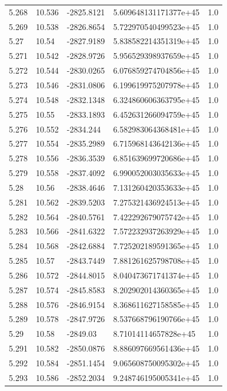 \begin{tabular}{lllll}
5.268 & 10.536 & -2825.8121 & 5.609648131171377e+45 & 1.0 \\
5.269 & 10.538 & -2826.8654 & 5.722970540499523e+45 & 1.0 \\
5.27 & 10.54 & -2827.9189 & 5.838582214351319e+45 & 1.0 \\
5.271 & 10.542 & -2828.9726 & 5.956529398937659e+45 & 1.0 \\
5.272 & 10.544 & -2830.0265 & 6.076859274704856e+45 & 1.0 \\
5.273 & 10.546 & -2831.0806 & 6.199619975207978e+45 & 1.0 \\
5.274 & 10.548 & -2832.1348 & 6.324860606363795e+45 & 1.0 \\
5.275 & 10.55 & -2833.1893 & 6.452631266094759e+45 & 1.0 \\
5.276 & 10.552 & -2834.244 & 6.582983064368481e+45 & 1.0 \\
5.277 & 10.554 & -2835.2989 & 6.715968143642136e+45 & 1.0 \\
5.278 & 10.556 & -2836.3539 & 6.851639699720686e+45 & 1.0 \\
5.279 & 10.558 & -2837.4092 & 6.990052003035633e+45 & 1.0 \\
5.28 & 10.56 & -2838.4646 & 7.131260420353633e+45 & 1.0 \\
5.281 & 10.562 & -2839.5203 & 7.275321436924513e+45 & 1.0 \\
5.282 & 10.564 & -2840.5761 & 7.422292679075742e+45 & 1.0 \\
5.283 & 10.566 & -2841.6322 & 7.572232937263929e+45 & 1.0 \\
5.284 & 10.568 & -2842.6884 & 7.725202189591365e+45 & 1.0 \\
5.285 & 10.57 & -2843.7449 & 7.881261625798708e+45 & 1.0 \\
5.286 & 10.572 & -2844.8015 & 8.040473671741374e+45 & 1.0 \\
5.287 & 10.574 & -2845.8583 & 8.202902014360365e+45 & 1.0 \\
5.288 & 10.576 & -2846.9154 & 8.368611627158585e+45 & 1.0 \\
5.289 & 10.578 & -2847.9726 & 8.537668796190766e+45 & 1.0 \\
5.29 & 10.58 & -2849.03 & 8.71014114657828e+45 & 1.0 \\
5.291 & 10.582 & -2850.0876 & 8.886097669561436e+45 & 1.0 \\
5.292 & 10.584 & -2851.1454 & 9.065608750095302e+45 & 1.0 \\
5.293 & 10.586 & -2852.2034 & 9.248746195005341e+45 & 1.0 \\

\end{tabular}
